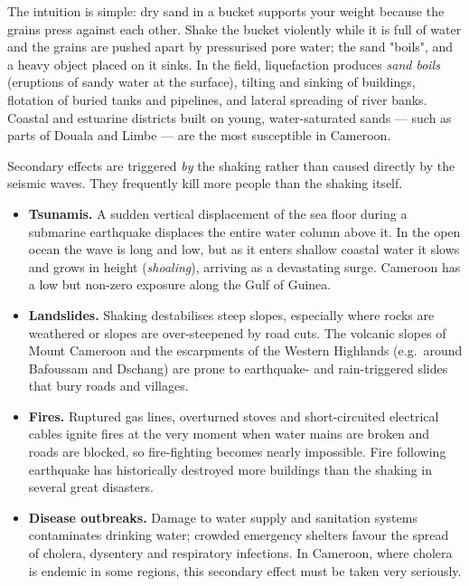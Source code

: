 \documentclass[11pt]{article}
\newcounter{popsec}
\newcounter{popsub}
\newcommand{\courssub}[1]{%
  \stepcounter{popsub}%
  \par\vspace{9pt}\noindent{\popxbold\fontsize{11.5}{13}\selectfont\color{popink}{\color{poporange}\thepopsec.\thepopsub}\hspace{6pt}#1}\par\nopagebreak\vspace{4pt}
}
\begin{document}
The intuition is simple: dry sand in a bucket supports your weight because the grains press against each other. Shake the bucket violently while it is full of water and the grains are pushed apart by pressurised pore water; the sand "boils", and a heavy object placed on it sinks. In the field, liquefaction produces \emph{sand boils} (eruptions of sandy water at the surface), tilting and sinking of buildings, flotation of buried tanks and pipelines, and lateral spreading of river banks. Coastal and estuarine districts built on young, water-saturated sands — such as parts of Douala and Limbe — are the most susceptible in Cameroon.

\courssub{Secondary Effects of Earthquakes}

Secondary effects are triggered \emph{by} the shaking rather than caused directly by the seismic waves. They frequently kill more people than the shaking itself.

\begin{itemize}
\item \textbf{Tsunamis.} A sudden vertical displacement of the sea floor during a submarine earthquake displaces the entire water column above it. In the open ocean the wave is long and low, but as it enters shallow coastal water it slows and grows in height (\emph{shoaling}), arriving as a devastating surge. Cameroon has a low but non-zero exposure along the Gulf of Guinea.
\item \textbf{Landslides.} Shaking destabilises steep slopes, especially where rocks are weathered or slopes are over-steepened by road cuts. The volcanic slopes of Mount Cameroon and the escarpments of the Western Highlands (e.g.\ around Bafoussam and Dschang) are prone to earthquake- and rain-triggered slides that bury roads and villages.
\item \textbf{Fires.} Ruptured gas lines, overturned stoves and short-circuited electrical cables ignite fires at the very moment when water mains are broken and roads are blocked, so fire-fighting becomes nearly impossible. Fire following earthquake has historically destroyed more buildings than the shaking in several great disasters.
\item \textbf{Disease outbreaks.} Damage to water supply and sanitation systems contaminates drinking water; crowded emergency shelters favour the spread of cholera, dysentery and respiratory infections. In Cameroon, where cholera is endemic in some regions, this secondary effect must be taken very seriously.
\end{itemize}
\end{document}
